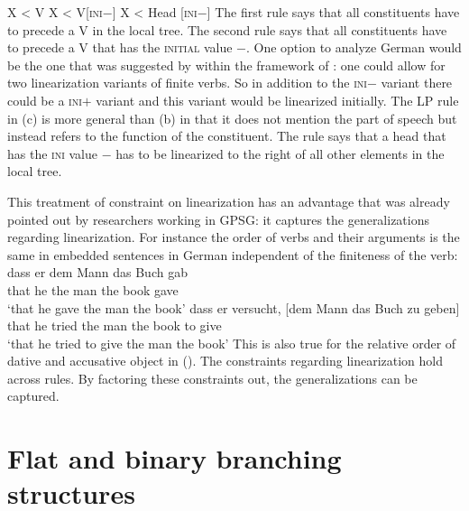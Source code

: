 \documentclass[output=paper]{langsci/langscibook}
\begin{document}
\eal
\ex X < V
\ex X < V[\textsc{ini}$-$]
\ex X < Head [\textsc{ini}$-$]
\zl
The first rule says that all constituents have to precede a V in the local tree. The second rule
says that all constituents have to precede a V that has the \textsc{initial} value $-$. One option
to analyze German would be the one that was suggested by \citet{Uszkoreit87a} within the framework
of : one could allow for two linearization variants of finite verbs. So in addition to the
\textsc{ini}$-$ variant there could be a \textsc{ini}$+$ variant and this variant would be
linearized initially. The LP rule in (c) is more general than (b) in that it does not
mention the part of speech but instead refers to the function of the constituent. The rule says that
a head that has the \textsc{ini} value $-$ has to be linearized to the right of all other elements
in the local tree.

This treatment of constraint on linearization has an advantage that was already pointed out by
researchers working in GPSG: it captures the generalizations regarding linearization. For instance
the order of verbs and their arguments is the same in embedded sentences in German independent of
the finiteness of the verb:
\eal
\ex 
\gll dass er dem Mann das Buch gab\\
     that he the man the book gave\\
\glt `that he gave the man the book'
\ex
\gll dass er versucht, [dem Mann das Buch zu geben]\\
     that he tried     \spacebr{}the man the book to give\\
\glt `that he tried to give the man the book'
\zl
This is also true for the relative order of dative and accusative object in (). The
constraints regarding linearization hold across rules. By factoring these constraints out, the
generalizations can be captured.


\section{Flat and binary branching structures}
\label{sec-binary-flat}
\end{document}
